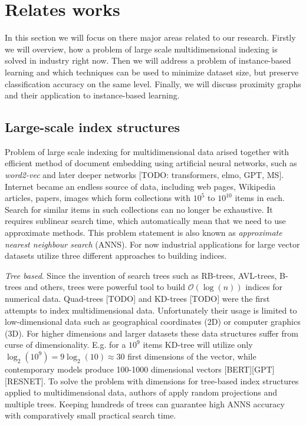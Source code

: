 \section{Relates works}\label{sec:OVERVIEW}

In this section we will focus on there major areas related to our research. Firstly we will overview, how a problem of large scale multidimensional indexing is solved in industry right now. Then we will address a problem of instance-based learning and which techniques can be used to minimize dataset size, but preserve classification accuracy on the same level. Finally, we will discuss proximity graphs and their application to instance-based learning.

\subsection{Large-scale index structures}

Problem of large scale indexing for multidimensional data arised together with efficient method of document embedding using artificial neural networks, such as \emph{word2-vec} \cite{word2vec} and later deeper networks [TODO: transformers, elmo, GPT, MS]. Internet became an endless source of data, including web pages, Wikipedia articles, papers, images which form collections with $10^5$ to $10^{10}$ items in each. 
Search for similar items in such collections can no longer be exhaustive. It requires sublinear search time, which automatically mean that we need to use approximate methods.
This problem statement is also known as \emph{approximate nearest neighbour search} (ANNS).
For now industrial applications for large vector datasets utilize three different approaches to building indices.

\emph{Tree based}. Since the invention of search trees such as RB-trees, AVL-trees, B-trees and others, trees were powerful tool to build $\mathcal{O}(\log(n))$ indices for numerical data. Quad-trees [TODO] and KD-trees [TODO] were the first attempts to index multidimensional data. Unfortunately their usage is limited to low-dimensional data such as geographical coordinates (2D) or computer graphics (3D).
For higher dimensions and larger datasets these data structures suffer from curse of dimensionality. E.g. for a $10^9$ items KD-tree will utilize only $\log_2(10^9)=9\log_2(10)\approx 30$ first dimensions of the vector, while contemporary models produce 100-1000 dimensional vectors [BERT][GPT][RESNET].
To solve the problem with dimensions for tree-based index structures applied to multidimensional data, authors of \cite{annoy} apply random projections and multiple trees. Keeping hundreds of trees can guarantee high ANNS accuracy with comparatively small practical search time.

